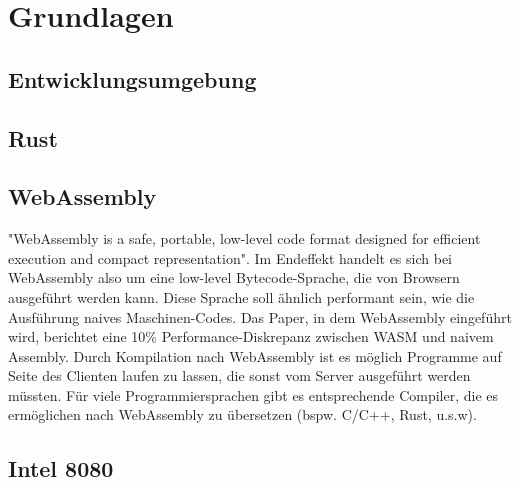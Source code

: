 \chapter{Grundlagen}

\section{Entwicklungsumgebung}

\section{Rust}

\section{WebAssembly}

"WebAssembly is a safe, portable, low-level code format designed for efficient execution and compact representation"\cite{WebAssemblyCoreSpecification}. Im Endeffekt handelt es sich bei WebAssembly also um eine low-level Bytecode-Sprache, die von Browsern ausgeführt werden kann. Diese Sprache soll ähnlich performant sein, wie die Ausführung naives Maschinen-Codes. Das Paper, in dem WebAssembly eingeführt wird, berichtet eine 10\% Performance-Diskrepanz zwischen WASM und naivem Assembly\cite{10.1145/3062341.3062363}. Durch Kompilation nach WebAssembly ist es möglich Programme auf Seite des Clienten laufen zu lassen, die sonst vom Server ausgeführt werden müssten.
Für viele Programmiersprachen gibt es entsprechende Compiler, die es ermöglichen nach WebAssembly zu übersetzen (bspw. C/C++, Rust, u.s.w).

\section{Intel 8080}
